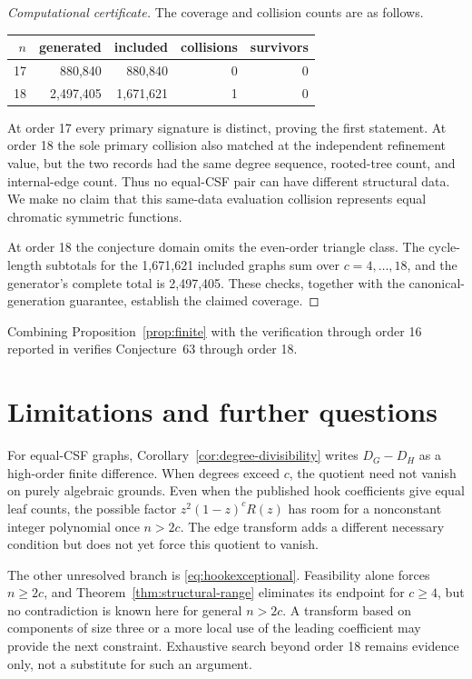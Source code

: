 \documentclass[11pt]{amsart}
\theoremstyle{definition}
\begin{document}
\begin{proof}[Computational certificate]
The coverage and collision counts are as follows.
\begin{center}
\small
\begin{tabular}{@{}rrrrr@{}}
\toprule
\(n\) & generated & included & collisions & survivors\\
\midrule
17 & 880,840 & 880,840 & 0 & 0\\
18 & 2,497,405 & 1,671,621 & 1 & 0\\
\bottomrule
\end{tabular}
\end{center}
At order 17 every primary signature is distinct, proving the first statement.
At order 18 the sole primary collision also matched at the independent
refinement value, but the two records had the same degree sequence,
rooted-tree count, and internal-edge count.  Thus no equal-CSF pair can have
different structural data.  We make no claim that this same-data evaluation
collision represents equal chromatic symmetric functions.

At order 18 the conjecture domain omits the even-order triangle class.  The
cycle-length subtotals for the 1,671,621 included graphs sum over
\(c=4,\ldots,18\), and the generator's complete total is 2,497,405.  These
checks, together with the canonical-generation guarantee, establish the
claimed coverage.
\end{proof}

Combining Proposition~\ref{prop:finite} with the verification through order
16 reported in \cite{BinghamEtAl2026} verifies Conjecture~63 through order 18.

\section{Limitations and further questions}

For equal-CSF graphs, Corollary~\ref{cor:degree-divisibility} writes
\(D_G-D_H\) as a high-order finite difference.  When degrees exceed \(c\),
the quotient need not vanish on purely algebraic grounds.  Even when the
published hook coefficients give equal leaf counts, the possible factor
\(z^2(1-z)^{c}R(z)\) has room for a nonconstant integer polynomial once
\(n>2c\).  The edge transform adds a different necessary condition but does
not yet force this quotient to vanish.

The other unresolved branch is \eqref{eq:hookexceptional}.  Feasibility alone
forces \(n\geq2c\), and Theorem~\ref{thm:structural-range} eliminates its
endpoint for \(c\geq4\), but no contradiction is known here for general
\(n>2c\).  A transform based on components of size three or a more local use
of the leading coefficient may provide the next constraint.  Exhaustive
search beyond order 18 remains evidence only, not a substitute for such an
argument.
\end{document}
